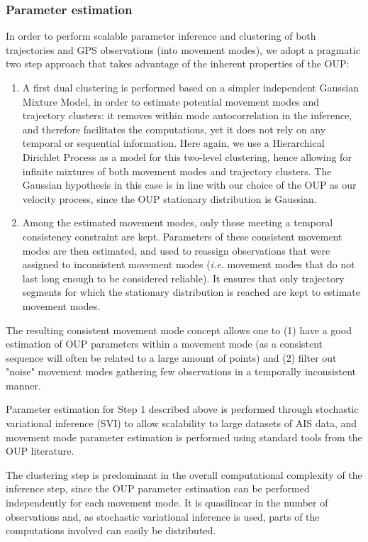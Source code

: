 \subsubsection{Parameter estimation}

In order to perform scalable parameter inference and clustering of both
trajectories and GPS observations (into movement modes), we adopt a pragmatic
two step approach that takes advantage of the inherent properties of the OUP:

\begin{enumerate}
\item A first dual clustering is performed based on a simpler independent
Gaussian Mixture Model, in order to estimate potential movement modes and
trajectory clusters: it removes within mode autocorrelation in
the inference, and therefore facilitates the computations, yet it does not rely
on any temporal or sequential information.
Here again, we use a Hierarchical Dirichlet Process as a model for this
two-level clustering, hence allowing for infinite mixtures of both movement
modes and trajectory clusters.
The Gaussian hypothesis in this case is in line with our choice of the OUP as
our velocity process, since the OUP stationary distribution is Gaussian.
\item Among the estimated movement modes, only those meeting a temporal consistency
constraint are kept.
Parameters of these consistent movement modes are then estimated, and used to
reassign observations that were assigned to inconsistent movement modes (\emph{i.e.}
movement modes that do not last long enough to be considered reliable).
It ensures that only trajectory segments for which the stationary distribution
is reached are kept to estimate movement modes.
\end{enumerate}

The resulting consistent movement mode concept allows one to (1) have a good
estimation of OUP parameters within a movement mode (as a consistent sequence
will often be related to a large amount of points) and (2) filter out
"noise" movement modes gathering few observations in a temporally
inconsistent manner.

Parameter estimation for Step 1 described above is performed through stochastic
variational inference (SVI) to allow scalability to large datasets of AIS data,
and movement mode parameter estimation is performed using standard tools from
the OUP literature.

The clustering
step is predominant in the overall computational complexity of the inference
step, since the OUP parameter estimation can be performed independently for each
movement mode.
It is quasilinear in the number of
observations and, as stochastic variational inference is used, parts of the
computations involved can easily be distributed.

